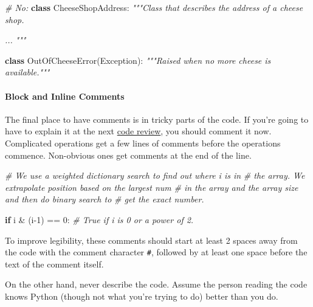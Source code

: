 \documentclass[
]{article}
\newenvironment{Shaded}{}{}
\newcommand{\CommentTok}[1]{\textcolor[rgb]{0.38,0.63,0.69}{\textit{#1}}}
\newcommand{\ControlFlowTok}[1]{\textcolor[rgb]{0.00,0.44,0.13}{\textbf{#1}}}
\newcommand{\DecValTok}[1]{\textcolor[rgb]{0.25,0.63,0.44}{#1}}
\newcommand{\KeywordTok}[1]{\textcolor[rgb]{0.00,0.44,0.13}{\textbf{#1}}}
\newcommand{\NormalTok}[1]{#1}
\newcommand{\OperatorTok}[1]{\textcolor[rgb]{0.40,0.40,0.40}{#1}}
\newcommand{\PreprocessorTok}[1]{\textcolor[rgb]{0.74,0.48,0.00}{#1}}
\begin{document}
\begin{samepage}
\begin{Shaded}
\begin{Highlighting}[]
\CommentTok{\# No:}
\KeywordTok{class}\NormalTok{ CheeseShopAddress:}
  \CommentTok{"""Class that describes the address of a cheese shop.}

\CommentTok{  ...}
\CommentTok{  """}

\KeywordTok{class}\NormalTok{ OutOfCheeseError(}\PreprocessorTok{Exception}\NormalTok{):}
  \CommentTok{"""Raised when no more cheese is available."""}
\end{Highlighting}
\end{Shaded}
\end{samepage}

\paragraph{Block and Inline Comments}

The final place to have comments is in tricky parts of the code. If
you're going to have to explain it at the next
\href{http://en.wikipedia.org/wiki/Code_review}{code review}, you should
comment it now. Complicated operations get a few lines of comments
before the operations commence. Non-obvious ones get comments at the end
of the line.

\begin{samepage}
\begin{Shaded}
\begin{Highlighting}[]
\CommentTok{\# We use a weighted dictionary search to find out where i is in}
\CommentTok{\# the array.  We extrapolate position based on the largest num}
\CommentTok{\# in the array and the array size and then do binary search to}
\CommentTok{\# get the exact number.}

\ControlFlowTok{if}\NormalTok{ i }\OperatorTok{\&}\NormalTok{ (i}\OperatorTok{{-}}\DecValTok{1}\NormalTok{) }\OperatorTok{==} \DecValTok{0}\NormalTok{:  }\CommentTok{\# True if i is 0 or a power of 2.}
\end{Highlighting}
\end{Shaded}
\end{samepage}

To improve legibility, these comments should start at least 2 spaces
away from the code with the comment character \texttt{\#}, followed by
at least one space before the text of the comment itself.

On the other hand, never describe the code. Assume the person reading
the code knows Python (though not what you're trying to do) better than
you do.
\end{document}
